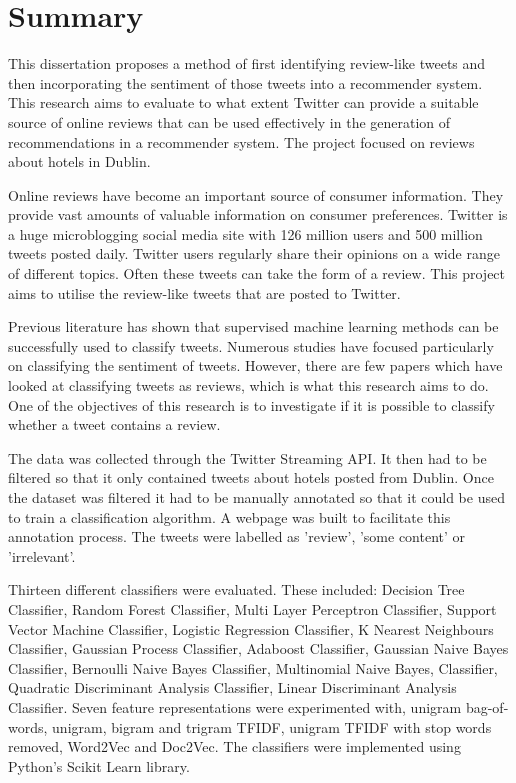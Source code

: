 \chapter{Summary}

This dissertation proposes a method of first identifying review-like tweets and then incorporating the sentiment of those tweets into a recommender system. This research aims to evaluate to what extent Twitter can provide a suitable source of online reviews that can be used effectively in the generation of recommendations in a recommender system. The project focused on reviews about hotels in Dublin.

Online reviews have become an important source of consumer information. They provide vast amounts of valuable information on consumer preferences. Twitter is a huge microblogging social media site with 126 million users and 500 million tweets posted daily. Twitter users regularly share their opinions on a wide range of different topics. Often these tweets can take the form of a review. This project aims to utilise the review-like tweets that are posted to Twitter.

Previous literature has shown that supervised machine learning methods can be successfully used to classify tweets. Numerous studies have focused particularly on classifying the sentiment of tweets. However, there are few papers which have looked at classifying tweets as reviews, which is what this research aims to do. One of the objectives of this research is to investigate if it is possible to classify whether a tweet contains a review.

The data was collected through the Twitter Streaming API. It then had to be filtered so that it only contained tweets about hotels posted from Dublin. Once the dataset was filtered it had to be manually annotated so that it could be used to train a classification algorithm. A webpage was built to facilitate this annotation process. The tweets were labelled as 'review', 'some content' or 'irrelevant'.

Thirteen different classifiers were evaluated. These included: Decision Tree Classifier, Random Forest Classifier, Multi Layer Perceptron Classifier, Support Vector Machine Classifier, Logistic Regression Classifier, K Nearest Neighbours Classifier, Gaussian Process Classifier, Adaboost Classifier, Gaussian Naive Bayes Classifier, Bernoulli Naive Bayes Classifier, Multinomial Naive Bayes, Classifier, Quadratic Discriminant Analysis Classifier, Linear Discriminant Analysis Classifier. Seven feature representations were experimented with, unigram bag-of-words, unigram, bigram and trigram TFIDF, unigram TFIDF with stop words removed, Word2Vec and Doc2Vec. The classifiers were implemented using Python's Scikit Learn library.

